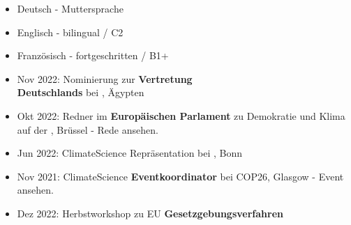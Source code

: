 \documentclass[10pt,a4paper,ragged2e,withhyper]{altacv}
\begin{document}
\begin{paracol}{2}

\begin{itemize}
    \item Deutsch - Muttersprache
    \item Englisch - bilingual / C2
    \item Französisch - fortgeschritten / B1+
\end{itemize}

\begin{itemize}
    \item Nov 2022: Nominierung zur \textbf{Vertretung}\\ \textbf{Deutschlands} bei , Ägypten
    \item Okt 2022: Redner im \textbf{Europäischen Parlament} zu Demokratie und Klima auf der  , Brüssel - Rede  ansehen.\
    \item Jun 2022: ClimateScience Repräsentation bei , Bonn
    \item Nov 2021: ClimateScience \textbf{Eventkoordinator} bei COP26, Glasgow - Event  ansehen.
\end{itemize}

\begin{itemize}
    \item Dez 2022:  Herbstworkshop zu EU \textbf{Gesetzgebungsverfahren} 
\end{itemize}

\newpage





\end{paracol}
\end{document}
